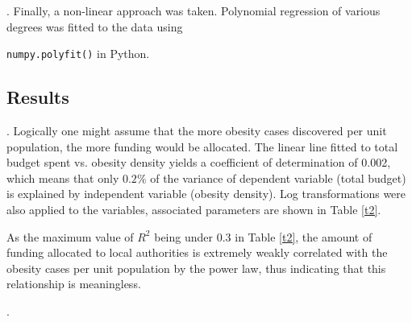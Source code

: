 \documentclass[12pt]{article}
\begin{document}
.
Finally, a non-linear approach was taken. Polynomial regression of various degrees was fitted to the data using {\verb|numpy.polyfit()| in Python. 


\subsection{Results}
. Logically one might assume that the more obesity cases discovered per unit population, the more funding would be allocated. The linear line fitted to total budget spent vs. obesity density yields a coefficient of determination of 0.002, which means that only $0.2\%$ of the variance of dependent variable (total budget) is explained by independent variable (obesity density). Log transformations were also applied to the variables, associated parameters are shown in Table \eqref{t2}. 


\begin{table}[H]
\begin{center}
\captionsetup{font=scriptsize}
\caption{coefficients related to the relationship between original and log-transformed total budget spent and obesity density} \label{t2}
\end{center}
\end{table}

As the maximum value of $R^2$ being under $0.3$ in Table \eqref{t2}, the amount of funding allocated to local authorities is extremely weakly correlated with the obesity cases per unit population by the power law, thus indicating that this relationship is meaningless. 


.



}
\end{document}
